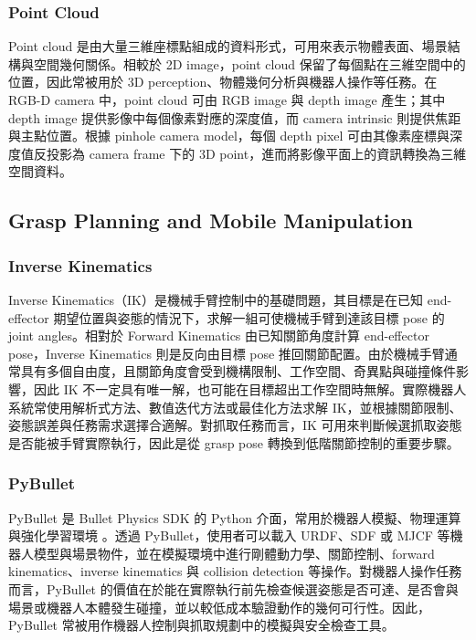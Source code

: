 \documentclass[12pt,a4paper]{article}
\begin{document}
\subsubsection{Point Cloud}

Point cloud 是由大量三維座標點組成的資料形式，可用來表示物體表面、場景結構與空間幾何關係。相較於 2D image，point cloud 保留了每個點在三維空間中的位置，因此常被用於 3D perception、物體幾何分析與機器人操作等任務。在 RGB-D camera 中，point cloud 可由 RGB image 與 depth image 產生；其中 depth image 提供影像中每個像素對應的深度值，而 camera intrinsic 則提供焦距與主點位置。根據 pinhole camera model，每個 depth pixel 可由其像素座標與深度值反投影為 camera frame 下的 3D point，進而將影像平面上的資訊轉換為三維空間資料。

\subsection{Grasp Planning and Mobile Manipulation}

\subsubsection{Inverse Kinematics}

Inverse Kinematics（IK）是機械手臂控制中的基礎問題，其目標是在已知 end-effector 期望位置與姿態的情況下，求解一組可使機械手臂到達該目標 pose 的 joint angles。相對於 Forward Kinematics 由已知關節角度計算 end-effector pose，Inverse Kinematics 則是反向由目標 pose 推回關節配置。由於機械手臂通常具有多個自由度，且關節角度會受到機構限制、工作空間、奇異點與碰撞條件影響，因此 IK 不一定具有唯一解，也可能在目標超出工作空間時無解。實際機器人系統常使用解析式方法、數值迭代方法或最佳化方法求解 IK，並根據關節限制、姿態誤差與任務需求選擇合適解。對抓取任務而言，IK 可用來判斷候選抓取姿態是否能被手臂實際執行，因此是從 grasp pose 轉換到低階關節控制的重要步驟。

\subsubsection{PyBullet}

PyBullet 是 Bullet Physics SDK 的 Python 介面，常用於機器人模擬、物理運算與強化學習環境 \cite{pybullet}。透過 PyBullet，使用者可以載入 URDF、SDF 或 MJCF 等機器人模型與場景物件，並在模擬環境中進行剛體動力學、關節控制、forward kinematics、inverse kinematics 與 collision detection 等操作。對機器人操作任務而言，PyBullet 的價值在於能在實際執行前先檢查候選姿態是否可達、是否會與場景或機器人本體發生碰撞，並以較低成本驗證動作的幾何可行性。因此，PyBullet 常被用作機器人控制與抓取規劃中的模擬與安全檢查工具。
\end{document}
